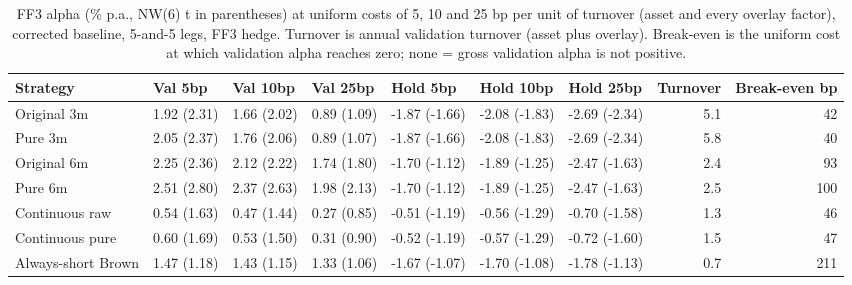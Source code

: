 \begin{table}
\caption{FF3 alpha (\% p.a., NW(6) t in parentheses) at uniform costs of 5, 10 and 25 bp per unit of turnover (asset and every overlay factor), corrected baseline, 5-and-5 legs, FF3 hedge. Turnover is annual validation turnover (asset plus overlay). Break-even is the uniform cost at which validation alpha reaches zero; none = gross validation alpha is not positive.}
\label{tab:m2_costs_corr}
\begin{tabular}{lllllllrr}
\toprule
Strategy & Val 5bp & Val 10bp & Val 25bp & Hold 5bp & Hold 10bp & Hold 25bp & Turnover & Break-even bp \\
\midrule
Original 3m & 1.92 (2.31) & 1.66 (2.02) & 0.89 (1.09) & -1.87 (-1.66) & -2.08 (-1.83) & -2.69 (-2.34) & 5.1 & 42 \\
Pure 3m & 2.05 (2.37) & 1.76 (2.06) & 0.89 (1.07) & -1.87 (-1.66) & -2.08 (-1.83) & -2.69 (-2.34) & 5.8 & 40 \\
Original 6m & 2.25 (2.36) & 2.12 (2.22) & 1.74 (1.80) & -1.70 (-1.12) & -1.89 (-1.25) & -2.47 (-1.63) & 2.4 & 93 \\
Pure 6m & 2.51 (2.80) & 2.37 (2.63) & 1.98 (2.13) & -1.70 (-1.12) & -1.89 (-1.25) & -2.47 (-1.63) & 2.5 & 100 \\
Continuous raw & 0.54 (1.63) & 0.47 (1.44) & 0.27 (0.85) & -0.51 (-1.19) & -0.56 (-1.29) & -0.70 (-1.58) & 1.3 & 46 \\
Continuous pure & 0.60 (1.69) & 0.53 (1.50) & 0.31 (0.90) & -0.52 (-1.19) & -0.57 (-1.29) & -0.72 (-1.60) & 1.5 & 47 \\
Always-short Brown & 1.47 (1.18) & 1.43 (1.15) & 1.33 (1.06) & -1.67 (-1.07) & -1.70 (-1.08) & -1.78 (-1.13) & 0.7 & 211 \\
\bottomrule
\end{tabular}
\end{table}
